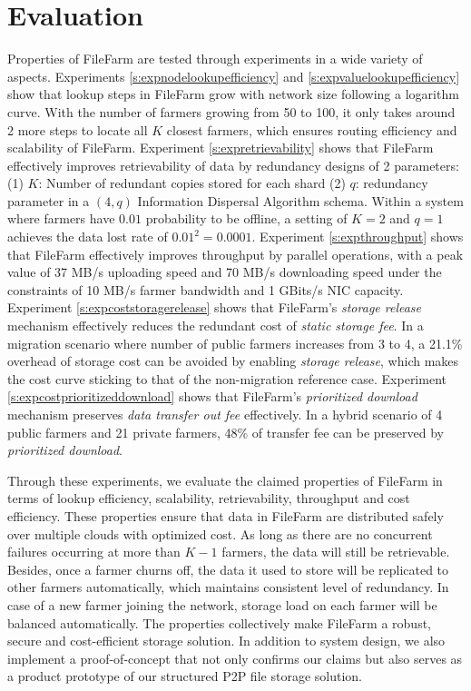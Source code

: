 \section{Evaluation}
\label{s:conclusionevaluation}

Properties of FileFarm are tested through experiments in a wide variety of aspects. Experiments \ref{s:expnodelookupefficiency} and \ref{s:expvaluelookupefficiency} show that lookup steps in FileFarm grow with network size following a logarithm curve. With the number of farmers growing from 50 to 100, it only takes around 2 more steps to locate all $K$ closest farmers, which ensures routing efficiency and scalability of FileFarm. Experiment \ref{s:expretrievability} shows that FileFarm effectively improves retrievability of data by redundancy designs of 2 parameters: (1) $K$: Number of redundant copies stored for each shard (2) $q$: redundancy parameter in a $(4, q)$ Information Dispersal Algorithm schema. Within a system where farmers have $0.01$ probability to be offline, a setting of $K=2$ and $q=1$ achieves the data lost rate of $0.01^{2}=0.0001$. Experiment \ref{s:expthroughput} shows that FileFarm effectively improves throughput by parallel operations, with a peak value of 37 MB/s uploading speed and 70 MB/s downloading speed under the constraints of 10 MB/s farmer bandwidth and 1 GBits/s NIC capacity. Experiment \ref{s:expcoststoragerelease} shows that FileFarm's \textit{storage release} mechanism effectively reduces the redundant cost of \textit{static storage fee}. In a migration scenario where number of public farmers increases from 3 to 4, a 21.1\% overhead of storage cost can be avoided by enabling \textit{storage release}, which makes the cost curve sticking to that of the non-migration reference case. Experiment \ref{s:expcostprioritizeddownload} shows that FileFarm's \textit{prioritized download} mechanism preserves \textit{data transfer out fee} effectively. In a hybrid scenario of 4 public farmers and 21 private farmers, 48\% of transfer fee can be preserved by \textit{prioritized download}.

Through these experiments, we evaluate the claimed properties of FileFarm in terms of lookup efficiency, scalability, retrievability, throughput and cost efficiency. These properties ensure that data in FileFarm are distributed safely over multiple clouds with optimized cost. As long as there are no concurrent failures occurring at more than $K − 1$ farmers, the data will still be retrievable. Besides, once a farmer churns off, the data it used to store will be replicated to other farmers automatically, which maintains consistent level of redundancy. In case of a new farmer joining the network, storage load on each farmer will be balanced automatically. The properties collectively make FileFarm a robust, secure and cost-efficient storage solution. In addition to system design, we also implement a proof-of-concept that not only confirms our claims but also serves as a product prototype of our structured P2P file storage solution.

